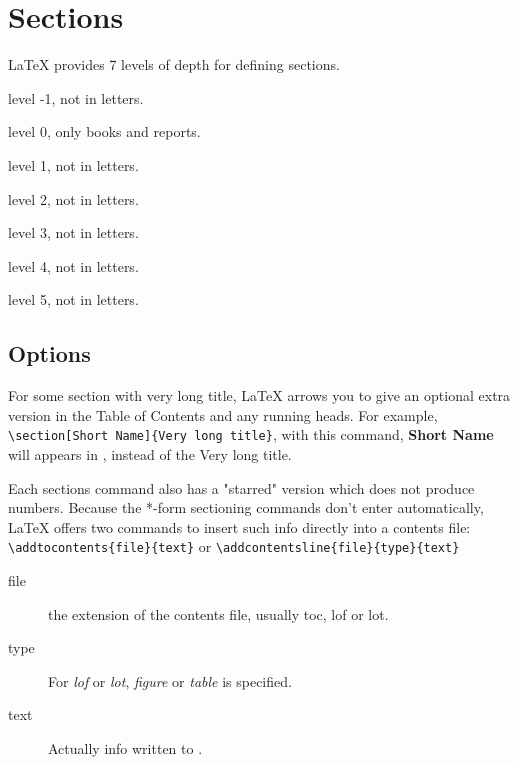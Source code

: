 \section{Sections}
\LaTeX{} provides 7 levels of depth for defining sections.
\begin{description}[style=nextline]
    \item [part]
	level -1, not in letters.
    \item [chapter] 
	level 0, only books and reports.
    \item [section] 
	level 1, not in letters.
    \item [subsection] 
	level 2, not in letters.
    \item [subsubsection] 
	level 3, not in letters.
    \item [paragraph] 
	level 4, not in letters.
    \item [subparagraph] 
	level 5, not in letters.
\end{description}

\subsection{Options}
    For some section with very long title, \LaTeX{} arrows you to give an
    optional extra version in the Table of Contents and any running heads.
    For example, \verb|\section[Short Name]{Very long title}|, with this
    command, \textbf{Short Name} will appears in \TOC{}, instead of the Very
    long title. 

Each sections command also has a "starred" version which does not produce
numbers. Because the *-form sectioning commands don't enter \TOC{}
automatically, \LaTeX{} offers two commands to insert such info directly
into a contents file: \\
\verb|\addtocontents{file}{text}| or
\verb|\addcontentsline{file}{type}{text}|
\begin{description}
    \item [file]    the extension of the contents file, usually toc, lof or
	lot.
    \item [type]    For \textit{lof} or \textit{lot},  \textit{figure} or
	\textit{table} is specified.
    \item [text]    Actually info written to \TOC{}.
\end{description}

